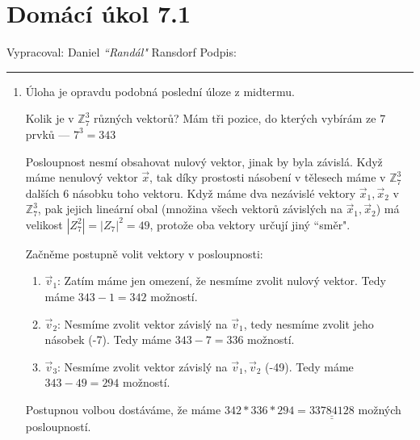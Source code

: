 \documentclass[12pt]{article}
\begin{document}
\section*{Domácí úkol 7.1}

Vypracoval: Daniel \textit{``Randál"} Ransdorf \hfill Podpis: \rule{4cm}{0.4pt}

\begin{enumerate}
  
  \item Úloha je opravdu podobná poslední úloze z midtermu. 
    
    Kolik je v $\mathbb{Z}_7^3$ různých vektorů?
      Mám tři pozice, do kterých vybírám ze 7 prvků --- $7^3 = 343$
      
    Posloupnost nesmí obsahovat nulový vektor, jinak by byla závislá.
    Když máme nenulový vektor $\vec{x}$, tak díky prostosti násobení v tělesech máme
      v $\mathbb{Z}_7^3$ dalších 6 násobku toho vektoru.
    Když máme dva nezávislé vektory $\vec{x}_1,\vec{x}_2$ v $\mathbb{Z}_7^3$, pak jejich lineární obal
      (množina všech vektorů závislých na $\vec{x}_1,\vec{x}_2$) má velikost
      $|Z_7^2| = |Z_7|^2 = 49$, protože oba vektory určují jiný ``směr".

    Začněme postupně volit vektory v posloupnosti:

    \begin{enumerate}
      \item $\vec{v}_1$: Zatím máme jen omezení, že nesmíme zvolit nulový vektor.
        Tedy máme $343-1=342$ možností.
      \item $\vec{v}_2$: Nesmíme zvolit vektor závislý na $\vec{v}_1$,
        tedy nesmíme zvolit jeho násobek (-7). Tedy máme $343-7=336$ možností.
      \item $\vec{v}_3$: Nesmíme zvolit vektor závislý na $\vec{v}_1,\vec{v}_2$ (-49).
        Tedy máme $343-49=294$ možností.
    \end{enumerate}

    Postupnou volbou dostáváme,
      že máme $342*336*294 = \underline{\underline{33784128}}$ možných posloupností.
    

\end{enumerate}
\end{document}
